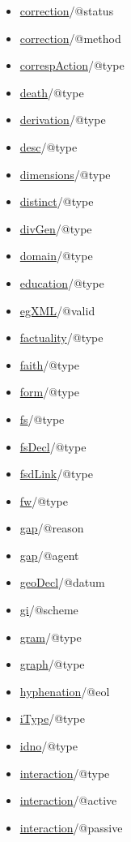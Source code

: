 \begin{reflist}
\begin{itemize}
\item \hyperref[TEI.correction]{correction}/@status
\item \hyperref[TEI.correction]{correction}/@method
\item \hyperref[TEI.correspAction]{correspAction}/@type
\item \hyperref[TEI.death]{death}/@type
\item \hyperref[TEI.derivation]{derivation}/@type
\item \hyperref[TEI.desc]{desc}/@type
\item \hyperref[TEI.dimensions]{dimensions}/@type
\item \hyperref[TEI.distinct]{distinct}/@type
\item \hyperref[TEI.divGen]{divGen}/@type
\item \hyperref[TEI.domain]{domain}/@type
\item \hyperref[TEI.education]{education}/@type
\item \hyperref[TEI.egXML]{egXML}/@valid
\item \hyperref[TEI.factuality]{factuality}/@type
\item \hyperref[TEI.faith]{faith}/@type
\item \hyperref[TEI.form]{form}/@type
\item \hyperref[TEI.fs]{fs}/@type
\item \hyperref[TEI.fsDecl]{fsDecl}/@type
\item \hyperref[TEI.fsdLink]{fsdLink}/@type
\item \hyperref[TEI.fw]{fw}/@type
\item \hyperref[TEI.gap]{gap}/@reason
\item \hyperref[TEI.gap]{gap}/@agent
\item \hyperref[TEI.geoDecl]{geoDecl}/@datum
\item \hyperref[TEI.gi]{gi}/@scheme
\item \hyperref[TEI.gram]{gram}/@type
\item \hyperref[TEI.graph]{graph}/@type
\item \hyperref[TEI.hyphenation]{hyphenation}/@eol
\item \hyperref[TEI.iType]{iType}/@type
\item \hyperref[TEI.idno]{idno}/@type
\item \hyperref[TEI.interaction]{interaction}/@type
\item \hyperref[TEI.interaction]{interaction}/@active
\item \hyperref[TEI.interaction]{interaction}/@passive

\end{itemize}
\end{reflist}
